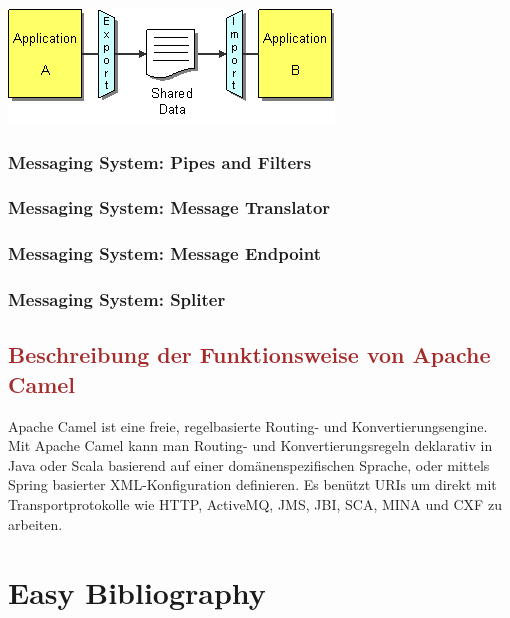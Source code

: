 \documentclass[12pt]{article}
\begin{document}
\includegraphics{images/filetransfer}

\subsubsection{Messaging System: Pipes and Filters}
\subsubsection{Messaging System: Message Translator}
\subsubsection{Messaging System: Message Endpoint}
\subsubsection{Messaging System: Spliter}



\textcolor{brown}{\section{Beschreibung der Funktionsweise von Apache Camel}}

Apache Camel ist eine freie, regelbasierte Routing- und Konvertierungsengine. Mit Apache Camel kann man Routing- und Konvertierungsregeln deklarativ in Java oder Scala basierend auf einer domänenspezifischen Sprache, oder mittels Spring basierter XML-Konfiguration definieren.\cite{CamelWiki} Es benützt URIs um direkt mit Transportprotokolle wie  HTTP, ActiveMQ, JMS, JBI, SCA, MINA und CXF zu arbeiten.

\newpage
\section{Easy Bibliography}

\listoftables
\listoffigures
\printglossaries
\end{document}
